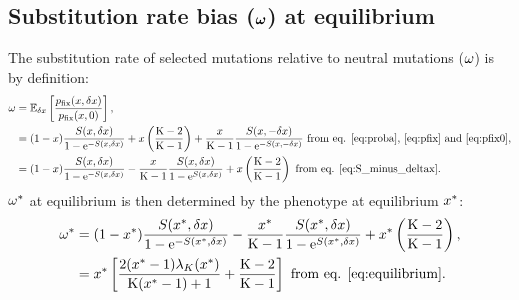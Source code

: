 \documentclass{article}
\begin{document}
\subsection{Substitution rate bias ($\bm{\omega}$) at equilibrium}
The substitution rate of selected mutations relative to neutral mutations ($\omega$) is by definition:
\begin{align}
\omega & = \operatorname{\mathbb{E}}_{\delta x} \left[ \frac{p_{\text{fix}}(x, \delta x)}{p_{\text{fix}}(x, 0)} \right], \\
 & = (1 - x) \frac{ S(x, \delta x)}{1 - \mathrm{e}^{-S(x, \delta x)}} + x \left(\frac{\text{K} - 2}{\text{K} - 1}\right) + \frac{x}{\text{K}-1} \frac{ S(x, -\delta x)}{1 - \mathrm{e}^{-S(x, -\delta x)}} \text{ from eq. \ref{eq:proba}, \ref{eq:pfix} and \ref{eq:pfix0}}, \\
 & = (1 - x) \frac{ S(x, \delta x)}{1 - \mathrm{e}^{-S(x, \delta x)}} - \frac{x}{\text{K}-1}  \frac{ S(x, \delta x)}{1 - \mathrm{e}^{S(x, \delta x)}} +  x \left(\frac{\text{K} - 2}{\text{K} - 1}\right) \text{ from eq. \ref{eq:S_minus_deltax}}.
\end{align}
$\omega^{*}$ at equilibrium is then determined by the phenotype at equilibrium $x^{*}$:
\begin{align}
\omega^{*} &= (1 - x^{*}) \frac{ S(x^{*}, \delta x)}{1 - \mathrm{e}^{-S(x^{*}, \delta x)}} - \frac{x^{*}}{\text{K}-1} \frac{ S(x^{*}, \delta x)}{1 - \mathrm{e}^{S(x^{*}, \delta x)}} + x^{*} \left(\frac{\text{K} - 2}{\text{K} - 1}\right) , \\
 &= x^{*} \left[ \frac{2 (x^{*}-1)  \lambda_{K}(x^{*}) }{\text{K} (x^{*}-1)+1} + \frac{\text{K} - 2}{\text{K} - 1}\right] \text{ from eq. \ref{eq:equilibrium}}.
\end{align}
\begin{center}
\end{center}
\end{document}
